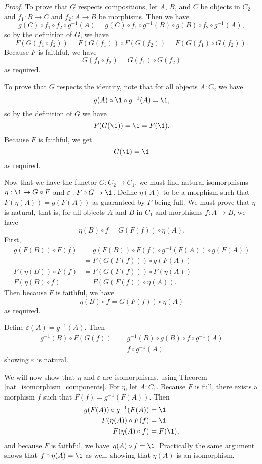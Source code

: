 \documentclass[../math.tex]{subfiles}
\begin{document}
\begin{proof}
    To prove that $G$ respects compositions, let $A$, $B$, and $C$ be objects in
    $C_2$ and $f_1 : B \to C$ and $f_2 : A \to B$ be morphisms.  Then we have
    \[
        g(C) \circ f_1 \circ f_2 \circ g^{-1}(A) = g(C) \circ f_1 \circ g^{-1}(B) \circ
        g(B) \circ f_2 \circ g^{-1}(A),
    \]
    so by the definition of $G$, we have
    \[
        F(G(f_1 \circ f_2)) = F(G(f_1)) \circ F(G(f_2))
        = F(G(f_1) \circ G(f_2)).
    \]
    Because $F$ is faithful, we have
    \[
        G(f_1 \circ f_2) = G(f_1) \circ G(f_2)
    \]
    as required.

    To prove that $G$ respects the identity, note that for all objects $A : C_2$
    we have
    \[
        g(A) \circ \1 \circ g^{-1}(A) = \1,
    \]
    so by the definition of $G$ we have
    \[
        F(G(\1)) = \1 = F(\1).
    \]
    Because $F$ is faithful, we get
    \[
        G(\1) = \1
    \]
    as required.

    Now that we have the functor $G : C_2 \to C_1$, we must find natural
    isomorphisms $\eta : \1 \to G \circ F$ and $\varepsilon : F \circ G \to \1$.
    Define $\eta(A)$ to be a morphism such that $F(\eta(A)) = g(F(A))$ as
    guaranteed by $F$ being full.  We must prove that $\eta$ is natural, that
    is, for all objects $A$ and $B$ in $C_1$ and morphisms $f : A \to B$, we
    have
    \[
        \eta(B) \circ f = G(F(f)) \circ \eta(A).
    \]
    First,
    \begin{align*}
        g(F(B)) \circ F(f)
            &= g(F(B)) \circ F(f) \circ g^{-1}(F(A)) \circ g(F(A)) \\
                           &= F(G(F(f))) \circ g(F(A)) \\
        F(\eta(B)) \circ F(f) &= F(G(F(f))) \circ F(\eta(A)) \\
        F(\eta(B) \circ f) &= F(G(F(f)) \circ \eta(A)).
    \end{align*}
    Then because $F$ is faithful, we have
    \[
        \eta(B) \circ f = G(F(f)) \circ \eta(A)
    \]
    as required.

    Define $\varepsilon(A) = g^{-1}(A)$.  Then
    \begin{align*}
        g^{-1}(B) \circ F(G(f))
        &= g^{-1}(B) \circ g(B) \circ f \circ g^{-1}(A) \\
        &= f \circ g^{-1}(A)
    \end{align*}
    showing $\varepsilon$ is natural.

    We will now show that $\eta$ and $\varepsilon$ are isomorphisms, using
    Theorem \ref{nat_isomorphism_components}.  For $\eta$, let $A : C_1$.
    Because $F$ is full, there exists a morphism $f$ such that $F(f) =
    g^{-1}(F(A))$.  Then
    \begin{align*}
        g(F(A)) \circ g^{-1}(F(A)) &= \1 \\
        F(\eta(A)) \circ F(f) &= \1 \\
        F(\eta(A) \circ f) &= F(\1),
    \end{align*}
    and because $F$ is faithful, we have $\eta(A) \circ f = \1$.  Practically
    the same argument shows that $f \circ \eta(A) = \1$ as well, showing that
    $\eta(A)$ is an isomorphism.


\end{proof}
\end{document}
